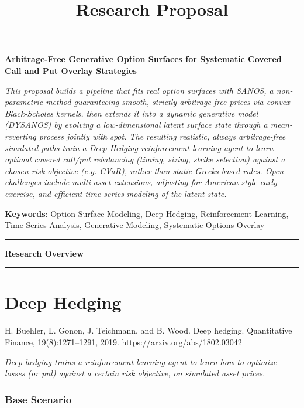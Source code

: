 \documentclass[11pt]{article}
\title{Research Proposal}
\author{}
\date{}
\begin{document}
\maketitle

\begin{center}
\textbf{Arbitrage-Free Generative Option Surfaces for Systematic Covered Call and Put Overlay Strategies}
\end{center}

\textit{This proposal builds a pipeline that fits real option surfaces with SANOS, a non-parametric method guaranteeing smooth, strictly arbitrage-free prices via convex Black-Scholes kernels, then extends it into a dynamic generative model (DYSANOS) by evolving a low-dimensional latent surface state through a mean-reverting process jointly with spot. The resulting realistic, always arbitrage-free simulated paths train a Deep Hedging reinforcement-learning agent to learn optimal covered call/put rebalancing (timing, sizing, strike selection) against a chosen risk objective (e.g. CVaR), rather than static Greeks-based rules. Open challenges include multi-asset extensions, adjusting for American-style early exercise, and efficient time-series modeling of the latent state.}

\vspace{1em}
\noindent\textbf{Keywords}: Option Surface Modeling, Deep Hedging, Reinforcement Learning, Time Series Analysis, Generative Modeling, Systematic Options Overlay

\vspace{1em}
\hrule
\begin{center}
\textbf{Research Overview}
\end{center}
\hrule
\vspace{1em}

\section*{Deep Hedging}

H. Buehler, L. Gonon, J. Teichmann, and B. Wood. Deep hedging. Quantitative Finance, 19(8):1271--1291, 2019.
\url{https://arxiv.org/abs/1802.03042}

\textit{Deep hedging trains a reinforcement learning agent to learn how to optimize losses (or pnl) against a certain risk objective, on simulated asset prices.}

\subsubsection*{Base Scenario}
\end{document}
